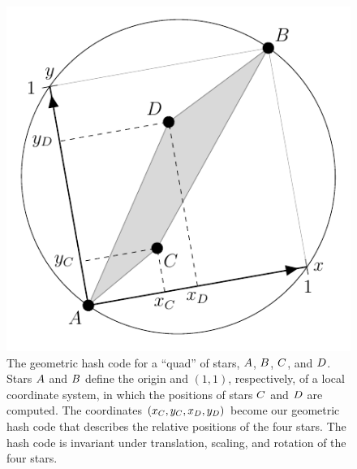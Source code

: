 \begin{figure}[htp]
  \begin{center}
    \includegraphics[width=\quadfigwidth]{quad-fig}
  \end{center} 
  \caption{The geometric hash code for a ``quad'' of stars, $A$,
      $B$, $C$, and $D$.  Stars $A$ and $B$
      define the origin and \mbox{$(1,1)$,} respectively, of a local
      coordinate system, in which the positions of stars $C$ and
      $D$ are computed.  The
      coordinates \mbox{$(x_{C},y_{C},x_{D},y_{D})$} become our geometric hash
      code that describes the relative positions of the four stars.
	  The hash code is invariant under translation, scaling, and
      rotation of the four stars.  \label{fig:quad}}
\end{figure}


